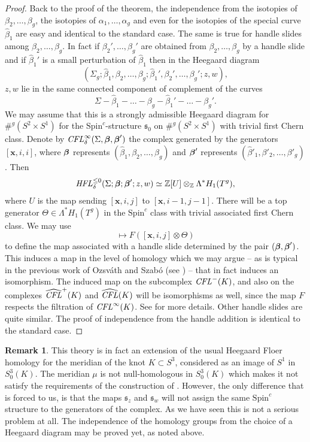 \documentclass{gtart_h}
\theoremstyle{definition}
\newtheorem{remark}[thm]{Remark}
\newcommand\x{\mathbf x}
\newcommand{\spinc}{\mathfrak s}
\newcommand\CFLhat{\widehat{\CFL}}
\newcommand\betas{\mbox{\boldmath$\beta$}}
\newcommand\HFL{\text{\it HFL\/}}
\newcommand\CFL{\text{\it CFL\/}}
\newcommand{\SpinC}{{\mathrm{Spin}}^c}
\begin{document}
\begin{proof}
Back to the proof of the theorem, the independence from the isotopies of
$\beta_2,\ldots,\beta_g$, the isotopies of $\alpha_1,\ldots,\alpha_g$
and even for the isotopies of the special curve $\hat \beta_1$ are easy
and identical to the standard case. The same
is true for handle slides among $\beta_2,\ldots,\beta_g$. In fact if
$\beta_2',\ldots,\beta_g'$ are obtained from $\beta_2,\ldots,\beta_g$ by a
handle slide and if $\hat \beta_1'$ is a small perturbation of
$\hat \beta_1$ then in the Heegaard diagram
$$
(\Sigma_g;\hat \beta_1,\beta_2,\ldots,\beta_g;
\hat \beta_1',\beta_2',\ldots,\beta_g';z,w),$$
$z,w$ lie in the same connected component of  complement of the
curves $$\Sigma-\hat \beta_1-\ldots-\beta_g-\hat \beta_1'-\ldots-\beta_g'.$$
We may assume that this is a strongly admissible Heegaard diagram
for $\#^g(S^2\times S^1)$ for the $\SpinC$-structure $\spinc_0$ on
$\#^g(S^2\times S^1)$ with trivial first Chern class. Denote by
$\CFL^\infty_\delta(\Sigma,\betas,\betas')$ the complex generated by the
generators $[\x,i,i]$, where $\betas$ represents
$(\hat \beta_1,\beta_2,\ldots,\beta_g)$ and $\betas'$ represents
$(\hat \beta'_1,\beta'_2,\ldots,\beta'_g)$. Then
\begin{displaymath}
\HFL^{\leq 0}_\delta(\Sigma;{\betas};{\betas'};z,w)\simeq
\mathbb{Z}[U]\otimes_\mathbb{Z} \Lambda^* H_1(T^g),
\end{displaymath}
where $U$ is the map sending $[\x,i,j]$ to $[\x,i-1,j-1]$. There will be
a top generator $\Theta \in \Lambda^*H_1(T^g)$ in the $\SpinC$ class
with trivial associated first Chern class. We  may use
\begin{displaymath}
[\x,i,j] \mapsto F([\x,i,j]\otimes \Theta)
\end{displaymath}
to define the map associated with a handle slide determined
by the pair $(\betas,\betas')$. This induces a map
in the level of homology which we may argue -- as is typical in the
previous work of Ozsv\'ath and Szab\'o (see \cite{OS-3m1}) -- that  in fact
induces an isomorphism.
The induced map on the subcomplex $\CFL^-(K)$, and also on the
complexes $\CFLhat^+(K)$ and $\CFLhat(K)$ will be isomorphisms as well,
since the map $F$ respects the filtration of $\CFL^\infty(K)$.
See \cite{OS-knot} for more
details. Other handle slides are quite similar. The proof of
independence from the handle addition is identical to the standard case.
\end{proof}

\begin{remark} This theory is in fact an extension of the usual Heegaard Floer homology for the
meridian of the knot $K\subset S^3$, considered as an image of $S^1$
 in $S^3_0(K)$. The meridian $\mu$ is not null-homologous
in $S^3_0(K)$ which makes it not satisfy the requirements of the construction of
\cite{OS-knot}.
However, the only difference that is forced to us, is that the maps $\spinc_z$ and
$\spinc_w$ will not assign the same $\SpinC$ structure to the generators of the complex.
As we have seen this is not a serious problem at all.
The independence of the homology groups from the choice of a
Heegaard diagram may be proved yet, as noted above.
\end{remark}
\end{document}
